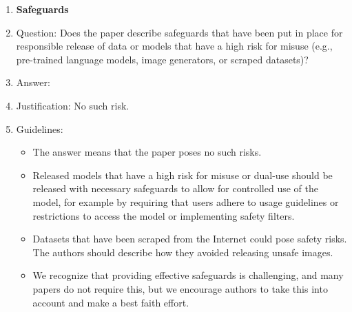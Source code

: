 \documentclass{article}
\theoremstyle{plain}
\theoremstyle{definition}
\theoremstyle{remark}
\begin{document}
\begin{enumerate}
\item {\bf Safeguards}
    \item[] Question: Does the paper describe safeguards that have been put in place for responsible release of data or models that have a high risk for misuse (e.g., pre-trained language models, image generators, or scraped datasets)?
    \item[] Answer: \answerNA{} %
    \item[] Justification: No such risk.
    \item[] Guidelines:
    \begin{itemize}
        \item The answer \answerNA{} means that the paper poses no such risks.
        \item Released models that have a high risk for misuse or dual-use should be released with necessary safeguards to allow for controlled use of the model, for example by requiring that users adhere to usage guidelines or restrictions to access the model or implementing safety filters. 
        \item Datasets that have been scraped from the Internet could pose safety risks. The authors should describe how they avoided releasing unsafe images.
        \item We recognize that providing effective safeguards is challenging, and many papers do not require this, but we encourage authors to take this into account and make a best faith effort.
    \end{itemize}


\end{enumerate}
\end{document}

